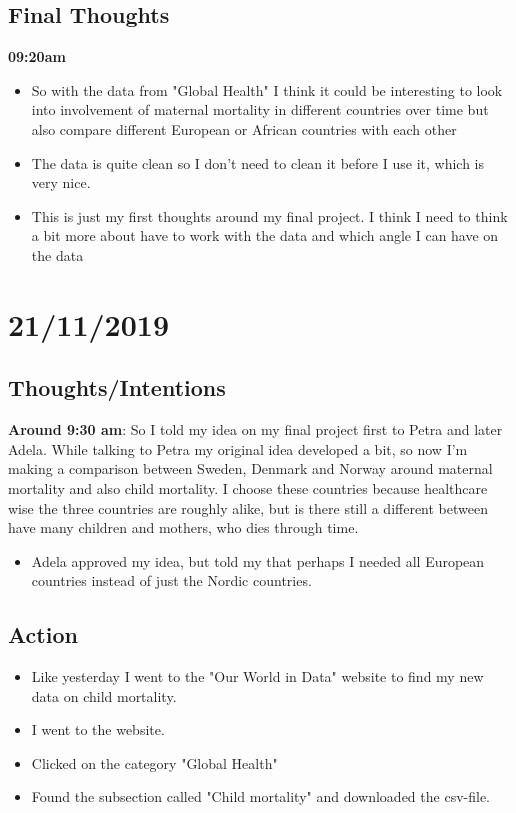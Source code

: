 \documentclass{article}
\begin{document}
\subsection{Final Thoughts}
\textbf{09:20am}
\begin{itemize}
    \item So with the data from "Global Health" I think it could be interesting to look into involvement of maternal mortality in different countries over time but also compare different European or African countries with each other  
    \item The data is quite clean so I don't need to clean it before I use it, which is very nice.
    \item This is just my first thoughts around my final project. I think I need to think a bit more about have to work with the data and which angle I can have on the data
\end{itemize}\bigskip


\section{21/11/2019}
\subsection{Thoughts/Intentions}
\textbf{Around 9:30 am}:  So I told my idea on my final project first to Petra and later Adela. While talking to Petra my original idea developed a bit, so now I'm making a comparison between Sweden, Denmark and Norway around maternal mortality and also child mortality. I choose these countries because healthcare wise the three countries are roughly alike, but is there  still a different  between have many children and mothers, who dies through time. 

\begin{itemize}
    \item  Adela approved my idea, but told my that perhaps I needed all European countries instead of just the Nordic countries.  
\end{itemize}

\subsection{Action}
\begin{itemize}
    \item Like yesterday I went to the "Our World in Data" website to find my new data on child mortality. 
    \item I went to the website. 
    \item Clicked on the category "Global Health" 
    \item  Found the subsection called "Child mortality" and downloaded the csv-file. 
\end{itemize}
\end{document}
